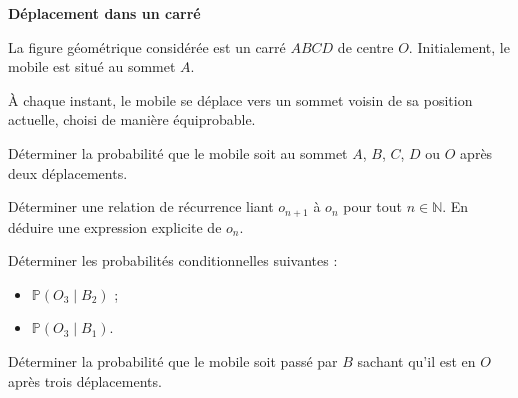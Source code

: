 \documentclass[10pt,a4paper]{article}
\begin{document}
\bigskip
\textbf{Déplacement dans un carré}

La figure géométrique considérée est un carré \( ABCD \) de centre \( O \). Initialement, le mobile
est situé au sommet \( A \).

À chaque instant, le mobile se déplace vers un sommet voisin de sa position actuelle, choisi de
manière équiprobable.

\q Déterminer la probabilité que le mobile soit au sommet \( A \), \( B \), \( C \), \( D \) ou \( O
\) après deux déplacements.

\q Déterminer une relation de récurrence liant \( o_{n+1} \) à \( o_n \) pour tout \( n \in
\mathbb{N} \). En déduire une expression explicite de \( o_n \).

\q Déterminer les probabilités conditionnelles suivantes :
\begin{itemize}
 \item \( \mathbb{P}(O_3 \mid B_2) \) ;
 \item \( \mathbb{P}(O_3 \mid B_1) \).
\end{itemize}

\q Déterminer la probabilité que le mobile soit passé par \( B \) sachant qu'il est en \( O \) après
trois déplacements.
\end{document}
